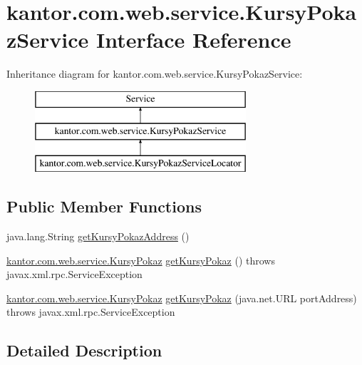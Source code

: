 \hypertarget{interfacekantor_1_1com_1_1web_1_1service_1_1_kursy_pokaz_service}{\section{kantor.\+com.\+web.\+service.\+Kursy\+Pokaz\+Service Interface Reference}
\label{interfacekantor_1_1com_1_1web_1_1service_1_1_kursy_pokaz_service}
}
Inheritance diagram for kantor.\+com.\+web.\+service.\+Kursy\+Pokaz\+Service\+:\begin{figure}[H]
\begin{center}
\leavevmode
\includegraphics[height=3.000000cm]{interfacekantor_1_1com_1_1web_1_1service_1_1_kursy_pokaz_service}
\end{center}
\end{figure}
\subsection*{Public Member Functions}
\begin{DoxyCompactItemize}
\item 
java.\+lang.\+String \hyperlink{interfacekantor_1_1com_1_1web_1_1service_1_1_kursy_pokaz_service_ac0c33b447ed2b6d5824b6856f24891dd}{get\+Kursy\+Pokaz\+Address} ()
\item 
\hyperlink{classkantor_1_1com_1_1web_1_1service_1_1_kursy_pokaz}{kantor.\+com.\+web.\+service.\+Kursy\+Pokaz} \hyperlink{interfacekantor_1_1com_1_1web_1_1service_1_1_kursy_pokaz_service_aeee39cf6bfa57a840b51ad1a2b28ecce}{get\+Kursy\+Pokaz} ()  throws javax.\+xml.\+rpc.\+Service\+Exception
\item 
\hyperlink{classkantor_1_1com_1_1web_1_1service_1_1_kursy_pokaz}{kantor.\+com.\+web.\+service.\+Kursy\+Pokaz} \hyperlink{interfacekantor_1_1com_1_1web_1_1service_1_1_kursy_pokaz_service_adfdcc96d8e32882d730e05cfc8c7c263}{get\+Kursy\+Pokaz} (java.\+net.\+U\+R\+L port\+Address)  throws javax.\+xml.\+rpc.\+Service\+Exception
\end{DoxyCompactItemize}


\subsection{Detailed Description}


